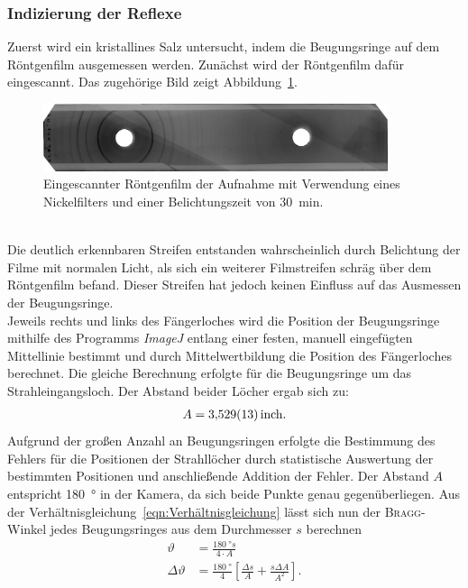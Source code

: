 \documentclass[a4paper,twoside,final]{article}
\begin{document}
\subsubsection{Indizierung der Reflexe}
Zuerst wird ein kristallines Salz untersucht, indem die Beugungsringe auf dem Röntgenfilm ausgemessen werden. Zunächst wird der Röntgenfilm dafür eingescannt. Das zugehörige Bild zeigt Abbildung~\ref{fig:Film_mitFilter}.
\begin{figure}[htp]
    \centering
        \includegraphics[width=0.9\textwidth]{Abbildungen/Roentgenfilm_mit_Filter.jpg}
    \caption{Eingescannter Röntgenfilm der Aufnahme mit Verwendung eines Nickelfilters und einer Belichtungszeit von \SI{30}{\minute}.}
    \label{fig:Film_mitFilter}
\end{figure}\\
Die deutlich erkennbaren Streifen entstanden wahrscheinlich durch Belichtung der Filme mit normalen Licht, als sich ein weiterer Filmstreifen schräg über dem Röntgenfilm befand. Dieser Streifen hat jedoch keinen Einfluss auf das Ausmessen der Beugungsringe.\\
Jeweils rechts und links des Fängerloches wird die Position der Beugungsringe mithilfe des Programms \textit{ImageJ} entlang einer festen, manuell eingefügten Mittellinie bestimmt und durch Mittelwertbildung die Position des Fängerloches berechnet. Die gleiche Berechnung erfolgte für die Beugungsringe um das Strahleingangsloch. Der Abstand beider Löcher ergab sich zu:
\begin{align}
  A = \SI{3,529\pm 0,013}{\text{inch}}.
\end{align}
Aufgrund der großen Anzahl an Beugungsringen erfolgte die Bestimmung des Fehlers für die Positionen der Strahllöcher durch statistische Auswertung der bestimmten Positionen und anschließende Addition der Fehler. Der Abstand $A$ entspricht \SI{180}{\degree} in der Kamera, da sich beide Punkte genau gegenüberliegen. Aus der Verhältnisgleichung~\eqref{eqn:Verhältnisgleichung} lässt sich nun der \textsc{Bragg}-Winkel jedes Beugungsringes aus dem Durchmesser $s$ berechnen
\begin{align}
  \vartheta &= \frac{\SI{180}{\degree}s}{4\cdot A}\\
  \Delta \vartheta &= \frac{\SI{180}{\degree}}{4}\left[\frac{\Delta s}{A} + \frac{s\Delta A}{A^2}\right].
\end{align}
\end{document}
